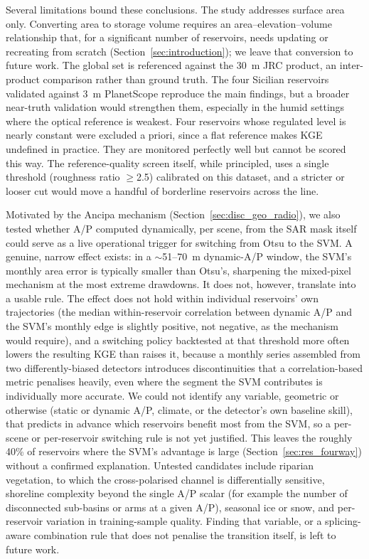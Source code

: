 Several limitations bound these conclusions. The study addresses surface area
only. Converting area to storage volume requires an area--elevation--volume
relationship that, for a significant number of reservoirs, needs updating
or recreating from scratch (Section~\ref{sec:introduction}); we leave that
conversion to future work.
The global set is referenced
against the 30~m JRC product, an inter-product comparison rather than ground
truth. The four Sicilian reservoirs validated against 3~m PlanetScope reproduce
the main findings, but a broader near-truth validation would strengthen them,
especially in the humid settings where the optical reference is weakest. Four
reservoirs whose regulated level is nearly constant were excluded a priori,
since a flat reference makes KGE undefined in practice. They are monitored
perfectly well but cannot be scored this way. The reference-quality screen
itself, while principled, uses a single threshold (roughness ratio
$\geq$2.5) calibrated on this dataset, and a stricter or looser cut would move a
handful of borderline reservoirs across the line.

Motivated by the Ancipa mechanism (Section~\ref{sec:disc_geo_radio}), we also
tested whether A/P computed dynamically, per scene, from the SAR mask itself
could serve as a live operational trigger for switching from Otsu to the SVM.
A genuine, narrow effect exists: in a $\sim$51--70~m dynamic-A/P window, the
SVM's monthly area error is typically smaller than Otsu's, sharpening the
mixed-pixel mechanism at the most extreme drawdowns. It does not, however,
translate into a usable rule. The effect does not hold within individual
reservoirs' own trajectories (the median within-reservoir correlation between
dynamic A/P and the SVM's monthly edge is slightly positive, not negative, as
the mechanism would require), and a switching policy backtested at that
threshold more often lowers the resulting KGE than raises it, because a
monthly series assembled from two differently-biased detectors introduces
discontinuities that a correlation-based metric penalises heavily, even where
the segment the SVM contributes is individually more accurate. We could not
identify any variable, geometric or otherwise (static or dynamic A/P, climate,
or the detector's own baseline skill), that predicts in advance which
reservoirs benefit most from the SVM, so a per-scene or per-reservoir
switching rule is not yet justified. This leaves the roughly 40\% of
reservoirs where the SVM's advantage is large (Section~\ref{sec:res_fourway})
without a confirmed explanation. Untested candidates include riparian
vegetation, to which the cross-polarised channel is differentially sensitive,
shoreline complexity beyond the single A/P scalar (for example the number of
disconnected sub-basins or arms at a given A/P), seasonal ice or snow, and
per-reservoir variation in training-sample quality. Finding that variable, or
a splicing-aware combination rule that does not penalise the transition
itself, is left to future work.

